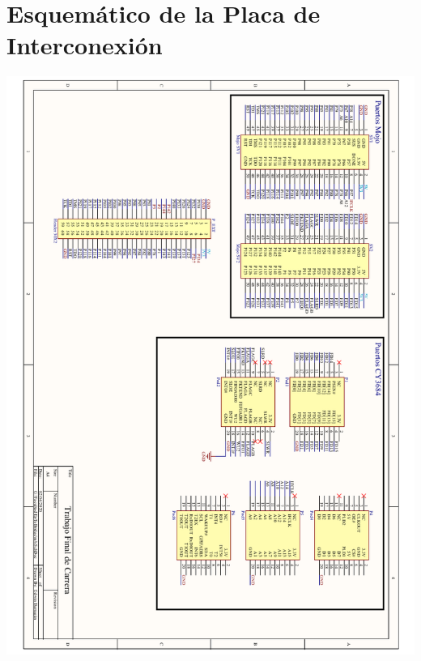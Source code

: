\chapter{Esquemático de la Placa de Interconexión}
	\label{ap:pcb}
	\begin{center}
		\includegraphics[height=.78\textheight]{secciones/extras/PCB/esquematicoPCB.png}
	\end{center}
